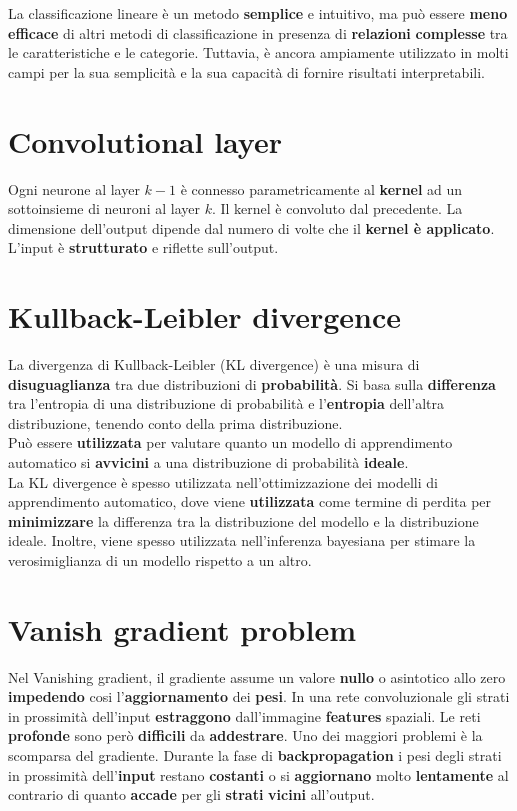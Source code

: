 \documentclass{article}
\begin{document}
La classificazione lineare è un metodo \textbf{semplice} e intuitivo, ma può essere \textbf{meno} \textbf{efficace} di altri metodi di classificazione in presenza di \textbf{relazioni} \textbf{complesse} tra le caratteristiche e le categorie. Tuttavia, è ancora ampiamente utilizzato in molti campi per la sua semplicità e la sua capacità di fornire risultati interpretabili.


\section{Convolutional layer}
Ogni neurone al layer $k-1$ è connesso parametricamente al \textbf{kernel} ad un sottoinsieme di neuroni al layer $k$. Il kernel è convoluto dal precedente. La dimensione dell'output dipende dal numero di volte che il \textbf{kernel è applicato}. L'input è \textbf{strutturato} e riflette sull'output.

\section{Kullback-Leibler divergence}
La divergenza di Kullback-Leibler (KL divergence) è una misura di \textbf{disuguaglianza} tra due distribuzioni di \textbf{probabilità}. Si basa sulla \textbf{differenza} tra l'entropia di una distribuzione di probabilità e l'\textbf{entropia} dell'altra distribuzione, tenendo conto della prima distribuzione.\\
 Può essere \textbf{utilizzata} per valutare quanto un modello di apprendimento automatico si \textbf{avvicini} a una distribuzione di probabilità \textbf{ideale}.\\
 La KL divergence è spesso utilizzata nell'ottimizzazione dei modelli di apprendimento automatico, dove viene \textbf{utilizzata} come termine di perdita per \textbf{minimizzare} la differenza tra la distribuzione del modello e la distribuzione ideale. Inoltre, viene spesso utilizzata nell'inferenza bayesiana per stimare la verosimiglianza di un modello rispetto a un altro.
 

\section{Vanish gradient problem}
Nel Vanishing gradient, il gradiente assume un valore \textbf{nullo} o asintotico allo zero \textbf{impedendo} cosi l’\textbf{aggiornamento} dei \textbf{pesi}. In una rete convoluzionale gli strati in prossimità dell’input \textbf{estraggono} dall'immagine \textbf{features} spaziali. Le reti \textbf{profonde} sono però \textbf{difficili} da \textbf{addestrare}. Uno dei maggiori problemi è la scomparsa del gradiente. Durante la fase di \textbf{backpropagation} i pesi degli strati in prossimità dell’\textbf{input} restano \textbf{costanti} o si \textbf{aggiornano} molto \textbf{lentamente} al contrario di quanto \textbf{accade} per gli \textbf{strati} \textbf{vicini} all’output.
\end{document}
